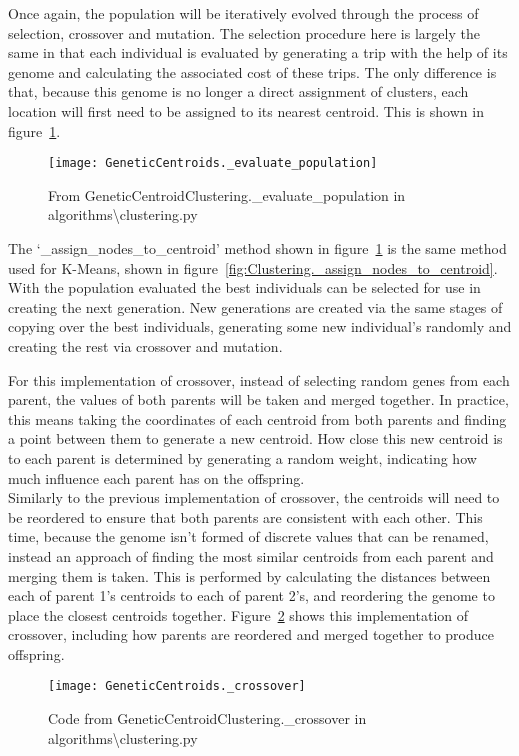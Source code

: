 \noindent
Once again, the population will be iteratively evolved through the process of selection, crossover and mutation.
The selection procedure here is largely the same in that each individual is evaluated by generating a trip with the help
of its genome and calculating the associated cost of these trips.
The only difference is that, because this genome is no longer a direct assignment of clusters, each location will first
need to be assigned to its nearest centroid.
This is shown in figure~\ref{fig:GeneticCentroids._evaluate_population}.
\begin{figure}[H]
    \centering
    \texttt{[image: GeneticCentroids.\_evaluate\_population]}
    \caption{From GeneticCentroidClustering.\_evaluate\_population in algorithms\textbackslash clustering.py}
    \label{fig:GeneticCentroids._evaluate_population}
\end{figure}

\noindent
The `\_assign\_nodes\_to\_centroid' method shown in figure~\ref{fig:GeneticCentroids._evaluate_population} is the same
method used for K-Means, shown in figure~\ref{fig:Clustering._assign_nodes_to_centroid}.
With the population evaluated the best individuals can be selected for use in creating the next generation.
New generations are created via the same stages of copying over the best individuals, generating some new
individual's randomly and creating the rest via crossover and mutation.

For this implementation of crossover, instead of selecting random genes from each parent, the values of both parents
will be taken and merged together.
In practice, this means taking the coordinates of each centroid from both parents and finding a point between them
to generate a new centroid.
How close this new centroid is to each parent is determined by generating a random weight, indicating how much
influence each parent has on the offspring.\\

\noindent
Similarly to the previous implementation of crossover, the centroids will need to be reordered to ensure that both
parents are consistent with each other.
This time, because the genome isn't formed of discrete values that can be renamed, instead an approach of
finding the most similar centroids from each parent and merging them is taken.
This is performed by calculating the distances between each of parent 1's centroids to each of parent 2's, and
reordering the genome to place the closest centroids together.
Figure~\ref{fig:GeneticCentroids._crossover} shows this implementation of crossover, including how parents are
reordered and merged together to produce offspring.
\begin{figure}[H]
    \centering
    \texttt{[image: GeneticCentroids.\_crossover]}
    \caption{Code from GeneticCentroidClustering.\_crossover in algorithms\textbackslash clustering.py}
    \label{fig:GeneticCentroids._crossover}
\end{figure}

